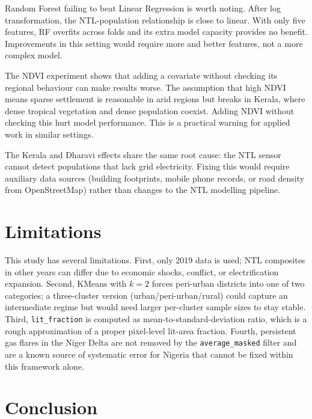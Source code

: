 \documentclass[conference]{IEEEtran}
\begin{document}
Random Forest failing to beat Linear Regression is worth noting. After log transformation, the NTL-population relationship is close to linear. With only five features, RF overfits across folds and its extra model capacity provides no benefit. Improvements in this setting would require more and better features, not a more complex model.

The NDVI experiment shows that adding a covariate without checking its regional behaviour can make results worse. The assumption that high NDVI means sparse settlement is reasonable in arid regions but breaks in Kerala, where dense tropical vegetation and dense population coexist. Adding NDVI without checking this hurt model performance. This is a practical warning for applied work in similar settings.

The Kerala and Dharavi effects share the same root cause: the NTL sensor cannot detect populations that lack grid electricity. Fixing this would require auxiliary data sources (building footprints, mobile phone records, or road density from OpenStreetMap) rather than changes to the NTL modelling pipeline.

\section{Limitations}

This study has several limitations. First, only 2019 data is used; NTL composites in other years can differ due to economic shocks, conflict, or electrification expansion. Second, KMeans with $k{=}2$ forces peri-urban districts into one of two categories; a three-cluster version (urban/peri-urban/rural) could capture an intermediate regime but would need larger per-cluster sample sizes to stay stable. Third, \texttt{lit\_fraction} is computed as mean-to-standard-deviation ratio, which is a rough approximation of a proper pixel-level lit-area fraction. Fourth, persistent gas flares in the Niger Delta are not removed by the \texttt{average\_masked} filter and are a known source of systematic error for Nigeria that cannot be fixed within this framework alone.

\section{Conclusion}
\end{document}
